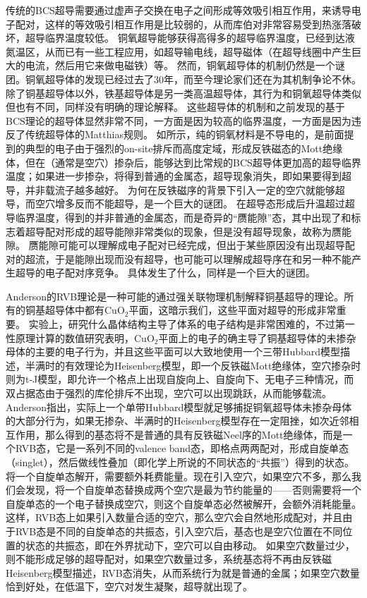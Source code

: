\documentclass[hyperref, UTF8]{ctexart}
\begin{document}
传统的BCS超导需要通过虚声子交换在电子之间形成等效吸引相互作用，来诱导电子配对，这样的等效吸引相互作用是比较弱的，从而库伯对非常容易受到热涨落破坏，超导临界温度较低。
铜氧超导能够获得高得多的超导临界温度，已经到达液氮温区，从而已有一些工程应用，如超导输电线，超导磁体（在超导线圈中产生巨大的电流，然后用它来做电磁铁）等。
然而，铜氧超导体的机制仍然是一个谜团。铜氧超导体的发现已经过去了30年，而至今理论家们还在为其机制争论不休。
除了铜基超导体以外，铁基超导体是另一类高温超导体，其行为和铜氧超导体类似但也有不同，同样没有明确的理论解释。
这些超导体的机制和之前发现的基于BCS理论的超导体显然非常不同，一方面是因为较高的临界温度，一方面是因为违反了传统超导体的Matthias规则\cite{Conder_2016}。
如所示，纯的铜氧材料是不导电的，是前面提到的典型的电子由于强烈的on-site排斥而高度定域，形成反铁磁态的Mott绝缘体，但在（通常是空穴）掺杂后，能够达到比常规的BCS超导体更加高的超导临界温度；如果进一步掺杂，将得到普通的金属态，超导现象消失，即如果要得到超导，并非载流子越多越好。
为何在反铁磁序的背景下引入一定的空穴就能够超导，而空穴增多反而不能超导，是一个巨大的谜团。
在超导态形成后升温超过超导临界温度，得到的并非普通的金属态，而是奇异的“赝能隙”态，其中出现了和标志着超导配对形成的超导能隙非常类似的现象，但是没有超导现象，故称为赝能隙。
赝能隙可能可以理解成电子配对已经完成，但出于某些原因没有出现超导配对的超流，于是能隙出现而没有超导，也可能可以理解成超导序在和另一种不能产生超导的电子配对序竞争。
具体发生了什么，同样是一个巨大的谜团。

Anderson的RVB理论是一种可能的通过强关联物理机制解释铜基超导的理论。所有的铜基超导体中都有CuO$_2$平面，这暗示我们，这些平面对超导的形成非常重要。
实验上，研究什么晶体结构主导了体系的电子结构是非常困难的，不过第一性原理计算的数值研究\cite{PhysRevLett.58.1028,PhysRevLett.58.1035}表明，CuO$_2$平面上的电子的确主导了铜基超导体的未掺杂母体的主要的电子行为，并且这些平面可以大致地使用一个三带Hubbard模型描述，半满时的有效理论为Heisenberg模型，即一个反铁磁Mott绝缘体，空穴掺杂时则为t-J模型，即允许一个格点上出现自旋向上、自旋向下、无电子三种情况，而双占据态由于强烈的库伦排斥不出现，空穴可以出现跳跃，从而能够载流\cite{emery1987theory}。
Anderson指出，实际上一个单带Hubbard模型就足够捕捉铜氧超导体未掺杂母体的大部分行为，如果无掺杂、半满时的Heisenberg模型存在一定阻挫，如次近邻相互作用，那么得到的基态将不是普通的具有反铁磁Neel序的Mott绝缘体，而是一个RVB态，它是一系列不同的valence band态，即格点两两配对，形成自旋单态（singlet），然后做线性叠加（即化学上所说的不同状态的“共振”）得到的状态。
将一个自旋单态解开，需要额外耗费能量。现在引入空穴，如果空穴不多，那么我们会发现，将一个自旋单态替换成两个空穴是最为节约能量的——否则需要将一个自旋单态的一个电子替换成空穴，则这个自旋单态必然被解开，会额外消耗能量。
这样，RVB态上如果引入数量合适的空穴，那么空穴会自然地形成配对，并且由于RVB态是不同的自旋单态的共振态，引入空穴后，基态也是空穴位置在不同位置的状态的共振态，即在外界扰动下，空穴可以自由移动。
如果空穴数量过少，则不能形成足够的超导配对，如果空穴数量过多，系统基态将不再由反铁磁Heisenberg模型描述，RVB态消失，从而系统行为就是普通的金属；如果空穴数量恰到好处，在低温下，空穴对发生凝聚，超导就出现了\cite{anderson1987resonating}。
\end{document}
